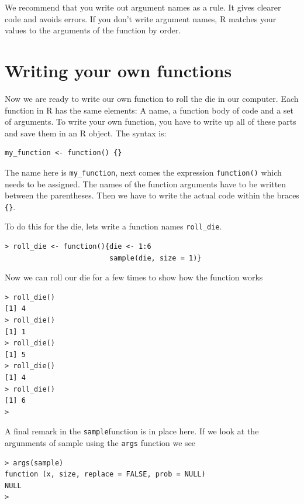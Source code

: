 \documentclass[
]{book}
\begin{document}
We recommend that you write out argument names as a rule. It gives clearer code and avoids
errors. If you don't write argument names, R matches your values to the arguments of the
function by order.

\hypertarget{writing-your-own-functions}{%
\section{Writing your own functions}\label{writing-your-own-functions}}

Now we are ready to write our own function to roll the die in our computer. Each function in R
has the same elements: A name, a function body of code and a set of arguments. To write your
own function, you have to write up all of these parts and save them in an R object. The syntax
is:

\begin{verbatim}
my_function <- function() {}
\end{verbatim}

The name here is \texttt{my\_function}, next comes the expression \texttt{function()} which needs to be assigned.
The names of the function arguments have to be written between the parentheses. Then we
have to write the actual code within the braces \texttt{\{\}}.

To do this for the die, lets write a function names \texttt{roll\_die}.

\begin{verbatim}
> roll_die <- function(){die <- 1:6 
                         sample(die, size = 1)}
\end{verbatim}

Now we can roll our die for a few times to show how the function works

\begin{verbatim}
> roll_die()
[1] 4
> roll_die()
[1] 1
> roll_die()
[1] 5
> roll_die()
[1] 4
> roll_die()
[1] 6
> 
\end{verbatim}

A final remark in the \texttt{sample}function is in place here. If we look at the argunments of
sample using the \texttt{args} function we see

\begin{verbatim}
> args(sample)
function (x, size, replace = FALSE, prob = NULL) 
NULL
> 
\end{verbatim}
\end{document}
